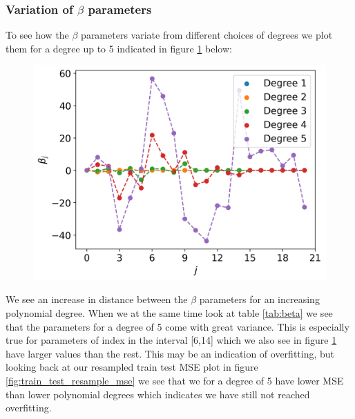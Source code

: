 \documentclass[12pt]{article}
\begin{document}
\subsubsection{Variation of $\beta$ parameters}

To see how the $\beta$ parameters variate from different choices of degrees we plot them for a degree up to 5 indicated in figure \ref{fig:beta} below:
\begin{figure}[H]
  \centering
  \includegraphics[width=.7\textwidth]{../figures/beta_degree.png}
  \caption{}
  \label{fig:beta}
\end{figure}
We see an increase in distance between the $\beta$ parameters for an increasing polynomial degree. When we at the same time look at table \ref{tab:beta} we see that the parameters for a degree of 5 come with great variance. This is especially true for parameters of index in the interval [6,14] which we also see in figure \ref{fig:beta} have larger values than the rest. This may be an indication of overfitting, but looking back at our resampled train test MSE plot in figure \ref{fig:train_test_resample_mse} we see that we for a degree of 5 have lower MSE than lower polynomial degrees which indicates we have still not reached overfitting.
\end{document}
